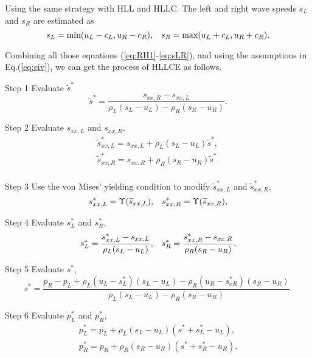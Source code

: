 \documentclass{article}
\theoremstyle{plain}\newtheorem{definition}{\sc{Definition}}
\theoremstyle{defination}\newtheorem{example}{Example}[section]
\numberwithin{equation}{section}
\numberwithin{table}{section}
\begin{document}
	Using the same strategy with HLL and HLLC. The left and right wave speeds $s_L$ and $s_R$ are estimated as
	\begin{equation}\label{eq:sLR}
	  s_L = \text{min} (u_L-c_L, u_R-c_R), \hspace{0.3cm} s_R = \text{max}(u_L+c_L, u_R+c_R).
	\end{equation}

	Combining all those equations (\ref{eq:RH1}-\ref{eq:sLR}), and using the assumptions in Eq.(\ref{eq:eiv}), we can get the process of HLLCE as follows.

	  Step 1 Evaluate  $\widetilde{s}^*$
\begin{equation}
  \widetilde{s}^* = \frac{s_{xx,R}- s_{xx,L}}{\rho_L(s_L-u_L)-\rho_R(s_R-u_R)}.
\end{equation}

Step 2 Evaluate $s_{xx,L}$ and $s_{xx,R}$,
\begin{align}
\widetilde{s}_{xx,L}^* = s_{xx,L} + \rho_L(s_L-u_L) \widetilde{s}^*,\\
\widetilde{s}_{xx,R}^* = s_{xx,R} + \rho_R(s_R-u_R) \widetilde{s}^*.\\
\end{align}

Step 3 Use the von Mises' yielding condition to modify $\widetilde{s}_{xx,L}^*$ and $\widetilde{s}_{xx,R}^*$,
\begin{equation}
  s_{xx,L}^* = \Upsilon(\widetilde{s}_{xx,L}), \hspace{0.3cm}s_{xx,R}^* = \Upsilon(\widetilde{s}_{xx,R}), 
\end{equation}

Step 4 Evaluate $s_L^*$ and $s_R^*$,
\begin{equation}
  s_L^* = \frac{s_{xx,L}^*-s_{xx,L}}{\rho_L(s_L-u_L)}, \hspace{0.3cm}  s_R^* = \frac{s_{xx,R}^*-s_{xx,R}}{\rho_R(s_R-u_R)}.
\end{equation}

Step 5 Evaluate $s^*$,
\begin{equation}
  s^* = \frac{p_R-p_L+\rho_L(u_L-s_L^*)(s_L-u_L)-\rho_R(u_R-s_{xR}^*)(s_R-u_R)}{\rho_L(s_L-u_L)-\rho_R(s_R-u_R)}.
\end{equation}

Step 6 Evaluate $p_L^*$ and $p_R^*$,
\begin{equation}
  \begin{aligned}
	p_L^* = p_L + \rho_L(s_L-u_L)(s^*+s_L^*-u_L),\\
	p_R^* = p_R +\rho_R(s_R-u_R)(s^*+s_{R}^*-u_R).\\
  \end{aligned}
\end{equation}
\end{document}
